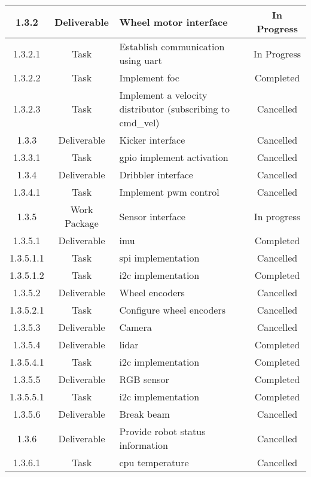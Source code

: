 \begin{longtable}{|c|c|m{}|c|}
    \rowcolor{p} 1.3.2 & Deliverable & Wheel motor interface & In Progress \\ \hline
    \rowcolor{p} 1.3.2.1 & Task & Establish communication using \acs{uart} & In Progress \\ \hline
    \rowcolor{d} 1.3.2.2 & Task & Implement \acs{foc} & Completed \\ \hline
    \rowcolor{c} 1.3.2.3 & Task & Implement a velocity distributor (subscribing to cmd\_vel) & Cancelled \\ \hline
    \rowcolor{c} 1.3.3 & Deliverable & Kicker interface & Cancelled \\ \hline
    \rowcolor{c} 1.3.3.1 & Task & \acs{gpio} implement activation & Cancelled \\ \hline
    \rowcolor{c} 1.3.4 & Deliverable & Dribbler interface & Cancelled \\ \hline
    \rowcolor{c} 1.3.4.1 & Task & Implement \acs{pwm} control & Cancelled \\ \hline
    \rowcolor{p} 1.3.5 & Work Package & Sensor interface & In progress \\ \hline
    \rowcolor{d} 1.3.5.1 & Deliverable & \acs{imu} & Completed \\ \hline
    \rowcolor{c} 1.3.5.1.1 & Task & \acs{spi} implementation & Cancelled \\ \hline
    \rowcolor{d} 1.3.5.1.2 & Task & \acs{i2c} implementation & Completed \\ \hline
    \rowcolor{c} 1.3.5.2 & Deliverable & Wheel encoders & Cancelled \\ \hline
    \rowcolor{c} 1.3.5.2.1 & Task & Configure wheel encoders & Cancelled \\ \hline
    \rowcolor{c} 1.3.5.3 & Deliverable & Camera & Cancelled \\ \hline
    \rowcolor{d} 1.3.5.4 & Deliverable & \acs{lidar} & Completed \\ \hline
    \rowcolor{d} 1.3.5.4.1 & Task & \acs{i2c} implementation & Completed \\ \hline
    \rowcolor{d} 1.3.5.5 & Deliverable & RGB sensor & Completed \\ \hline
    \rowcolor{d} 1.3.5.5.1 & Task & \acs{i2c} implementation & Completed \\ \hline
    \rowcolor{c} 1.3.5.6 & Deliverable & Break beam & Cancelled \\ \hline
    \rowcolor{c} 1.3.6 & Deliverable & Provide robot status information & Cancelled \\ \hline
    \rowcolor{c} 1.3.6.1 & Task & \acs{cpu} temperature & Cancelled \\ \hline

\end{longtable}

